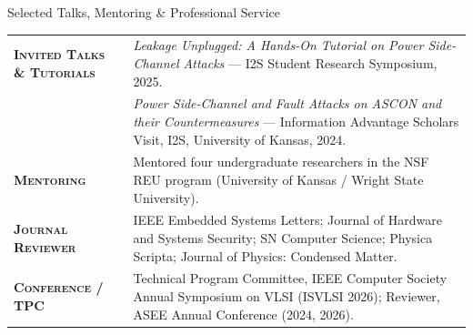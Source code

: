 \begin{rSection}{Selected Talks, Mentoring \& Professional Service}

\begin{tabularx}{\linewidth}{@{}p{4.6cm}X@{}}
\textsc{\textbf{Invited Talks \& Tutorials}} &
\emph{Leakage Unplugged: A Hands-On Tutorial on Power Side-Channel Attacks} --- I2S Student Research Symposium, 2025. \\
& \emph{Power Side-Channel and Fault Attacks on ASCON and their Countermeasures} --- Information Advantage Scholars Visit, I2S, University of Kansas, 2024. \\[0.15cm]

\textsc{\textbf{Mentoring}} &
Mentored four undergraduate researchers in the NSF REU program (University of Kansas / Wright State University). \\[0.15cm]

\textsc{\textbf{Journal Reviewer}} &
IEEE Embedded Systems Letters; Journal of Hardware and Systems Security; SN Computer Science; Physica Scripta; Journal of Physics: Condensed Matter. \\[0.15cm]

\textsc{\textbf{Conference / TPC}} &
Technical Program Committee, IEEE Computer Society Annual Symposium on VLSI (ISVLSI 2026); Reviewer, ASEE Annual Conference (2024, 2026). \\
\end{tabularx}

\end{rSection}
